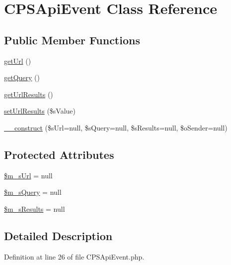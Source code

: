 \hypertarget{classCPSApiEvent}{
\section{CPSApiEvent Class Reference}
\label{classCPSApiEvent}
}
\subsection*{Public Member Functions}
\begin{DoxyCompactItemize}
\item 
\hyperlink{classCPSApiEvent_accd14bda49a1044b4d8dd93f020f11ee}{getUrl} ()
\item 
\hyperlink{classCPSApiEvent_a55f162785567258fe5138af282e588c2}{getQuery} ()
\item 
\hyperlink{classCPSApiEvent_ade48155878625792024b8c27e997d423}{getUrlResults} ()
\item 
\hyperlink{classCPSApiEvent_a1b8ec42a51f004d1021b63d878cd847e}{setUrlResults} (\$sValue)
\item 
\hyperlink{classCPSApiEvent_a21b46e09a674be0eb1de3222c2ae95d7}{\_\-\_\-construct} (\$sUrl=null, \$sQuery=null, \$sResults=null, \$oSender=null)
\end{DoxyCompactItemize}
\subsection*{Protected Attributes}
\begin{DoxyCompactItemize}
\item 
\hyperlink{classCPSApiEvent_ab16efc62694fc7d6620d2f951db167ac}{\$m\_\-sUrl} = null
\item 
\hyperlink{classCPSApiEvent_a3d8ef5c5637fd1aa893e2a3a62b45a5a}{\$m\_\-sQuery} = null
\item 
\hyperlink{classCPSApiEvent_a754b3666c127a03700fe876153602f62}{\$m\_\-sResults} = null
\end{DoxyCompactItemize}


\subsection{Detailed Description}


Definition at line 26 of file CPSApiEvent.php.



